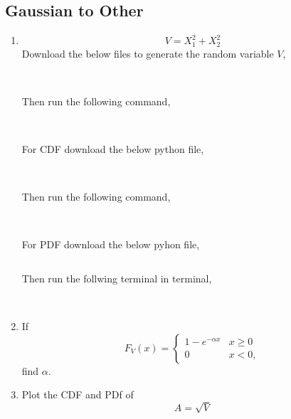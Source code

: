 \documentclass[journal,12pt,twocolumn]{IEEEtran}
\renewcommand\thesection{\arabic{section}}
\begin{document}
\begin{enumerate}[label=\thesection.\arabic*
,ref=\thesection.\theenumi]
\section{Gaussian to Other}
\begin{enumerate}[label=\thesection.\arabic*
,ref=\thesection.\theenumi]
\item
%
\begin{equation}
V = X_1^2 + X_2^2
\end{equation}
 \solution Download the below files to generate the random variable $V$,
	 \begin{lstlisting}
          
         \end{lstlisting}
	Then run the following command,
	 \begin{lstlisting}
	  
	 \end{lstlisting}
	 For CDF download the below python file,
	 \begin{lstlisting}
	 
	 \end{lstlisting}
	 Then run the following command,
	\begin{lstlisting}
          
        \end{lstlisting}
       For PDF download the below pyhon file,
	\begin{lstlisting}

        \end{lstlisting}
       Then run the follwing terminal in terminal,
	\begin{lstlisting}
	 
	\end{lstlisting}
%
%
%
\item
If
%
\begin{equation}
F_{V}(x) =
\begin{cases}
1 - e^{-\alpha x} & x \geq 0 \\
0 & x < 0,
\end{cases}
\end{equation}
%
find $\alpha$.\\
%
\item
\label{ch3_raleigh_sim}
Plot the CDF and PDf of
%
\begin{equation}
A = \sqrt{V}
\end{equation}
%
\end{enumerate}

\end{enumerate}
\end{document}

